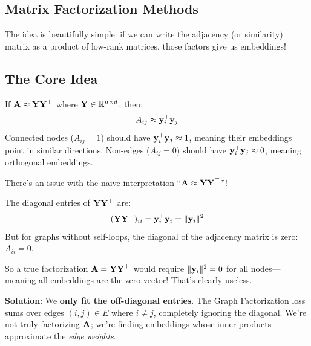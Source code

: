 \begin{notechapter}
\section{Matrix Factorization Methods}

The idea is beautifully simple: if we can write the adjacency (or similarity) matrix as a product of low-rank matrices, those factors give us embeddings!

\subsection{The Core Idea}

\begin{keyinsight}
If $\mathbf{A} \approx \mathbf{Y} \mathbf{Y}^\top$ where $\mathbf{Y} \in \mathbb{R}^{n \times d}$, then:
\[
A_{ij} \approx \mathbf{y}_i^\top \mathbf{y}_j
\]
Connected nodes ($A_{ij} = 1$) should have $\mathbf{y}_i^\top \mathbf{y}_j \approx 1$, meaning their embeddings point in similar directions. Non-edges ($A_{ij} = 0$) should have $\mathbf{y}_i^\top \mathbf{y}_j \approx 0$, meaning orthogonal embeddings.
\end{keyinsight}

\begin{alarmbox}
There's an issue with the naive interpretation ``$\mathbf{A} \approx \mathbf{Y}\mathbf{Y}^\top$''! 

The diagonal entries of $\mathbf{Y} \mathbf{Y}^\top$ are:
\[
(\mathbf{Y} \mathbf{Y}^\top)_{ii} = \mathbf{y}_i^\top \mathbf{y}_i = \|\mathbf{y}_i\|^2
\]
But for graphs without self-loops, the diagonal of the adjacency matrix is zero: $A_{ii} = 0$. 

So a true factorization $\mathbf{A} = \mathbf{Y}\mathbf{Y}^\top$ would require $\|\mathbf{y}_i\|^2 = 0$ for all nodes---meaning all embeddings are the zero vector! That's clearly useless.

\textbf{Solution}: We \textbf{only fit the off-diagonal entries}. The Graph Factorization loss sums over edges $(i,j) \in E$ where $i \neq j$, completely ignoring the diagonal. We're not truly factorizing $\mathbf{A}$; we're finding embeddings whose inner products approximate the \emph{edge weights}.
\end{alarmbox}


\end{notechapter}
